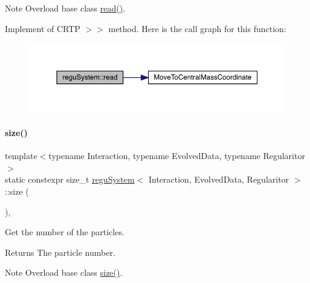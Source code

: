 \begin{DoxyNote}{Note}
Overload base class \mbox{\hyperlink{classregu_system_ae26daf3f6058c1be67fb00366706e2e4}{read()}}.
\end{DoxyNote}
Implement of C\+R\+TP \textquotesingle{}$>$$>$\textquotesingle{} method. Here is the call graph for this function\+:\nopagebreak
\begin{figure}[H]
\begin{center}
\leavevmode
\includegraphics[width=350pt]{classregu_system_ae26daf3f6058c1be67fb00366706e2e4_cgraph}
\end{center}
\end{figure}
\mbox{\label{classregu_system_aceb0955bcd3e6ba7a6a1831953ac120b}} 
\paragraph{\texorpdfstring{size()}{size()}}
{\footnotesize\ttfamily template$<$typename Interaction, typename Evolved\+Data, typename Regularitor$>$ \\
static constexpr size\+\_\+t \mbox{\hyperlink{classregu_system}{regu\+System}}$<$ Interaction, Evolved\+Data, Regularitor $>$\+::size (\begin{DoxyParamCaption}{ }\end{DoxyParamCaption})\hspace{0.3cm}{\ttfamily [inline]}, {\ttfamily [static]}}



Get the number of the particles. 

\begin{DoxyReturn}{Returns}
The particle number. 
\end{DoxyReturn}
\begin{DoxyNote}{Note}
Overload base class \mbox{\hyperlink{classregu_system_aceb0955bcd3e6ba7a6a1831953ac120b}{size()}}. 
\end{DoxyNote}
\mbox{\label{classregu_system_ad9aa4594055c550b56cda4242d498d45}} 
